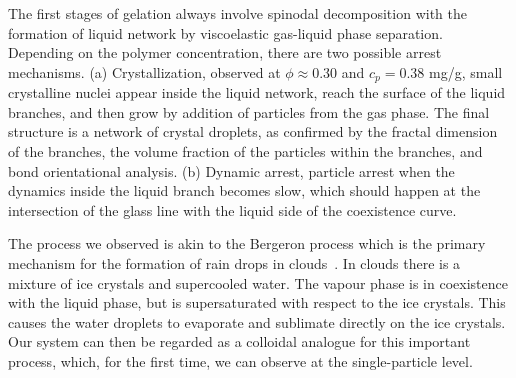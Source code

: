 \documentclass[preprint,amsmath,amssymb,superscriptaddress]{revtex4}
\begin{document}
The first stages of gelation always involve spinodal decomposition with the formation
of liquid network by viscoelastic gas-liquid phase separation. 
Depending on the polymer concentration, there are two possible arrest mechanisms. 
(a) Crystallization, observed at $\phi\approx 0.30$ and $c_p=0.38$ mg/g, small crystalline nuclei appear inside the liquid network, reach the surface 
 of the liquid branches, and then grow by addition of particles from the gas phase. The final structure is a network of crystal droplets,
 as confirmed by the fractal dimension of the branches, the volume fraction of the particles within the branches, and bond orientational analysis. 
(b) Dynamic arrest, particle arrest when the dynamics inside the liquid branch becomes slow, which should happen at the intersection of the
 glass line with the liquid side of the coexistence curve. 

The process we observed is akin to the Bergeron process which is the primary mechanism for the formation of rain drops in clouds~\cite{glickman2000glossary,morrison2012resilience}.
In clouds there is a mixture of ice crystals and supercooled water. The vapour phase is in coexistence with the liquid phase, but is supersaturated
with respect to the ice crystals. This causes the water droplets to evaporate and sublimate directly on the ice crystals. Our system can then
be regarded as a colloidal analogue for this important process, which, for the first time, we can observe at the single-particle level.  
\end{document}
